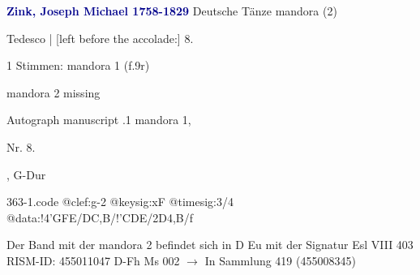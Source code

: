 \documentclass[twocolumn]{book}
\begin{document}
\newline \par \vspace{7pt} \textcolor{darkblue}{\textbf{Zink, Joseph Michael  1758-1829}}
\newline Deutsche Tänze
\newline mandora (2)
\newline \begin{itshape}[f.9v, at left:] Tedesco | [left before the accolade:] 8.\end{itshape} 
\newline \textcolor{darkblue}{}  1 Stimmen: mandora 1  (f.9r)
\newline \begin{small} mandora 2 missing\end{small} 
\newline Autograph manuscript
.1  mandora 1, \begin{itshape}Nr. 8.\end{itshape}, G-Dur  
\begin{filecontents*}{363-1.code}
@clef:g-2
@keysig:xF
@timesig:3/4
@data:!4'GFE/DC,B/!'CDE/2D4,B/f
\end{filecontents*}
\newline
%
\newline Der Band mit der mandora 2 befindet sich in D Eu mit der Signatur Esl VIII 403
\newline RISM-ID: 455011047
\newline D-Fh  Ms 002
\newline $\rightarrow$ In Sammlung 419 (455008345)
      
\end{document}
